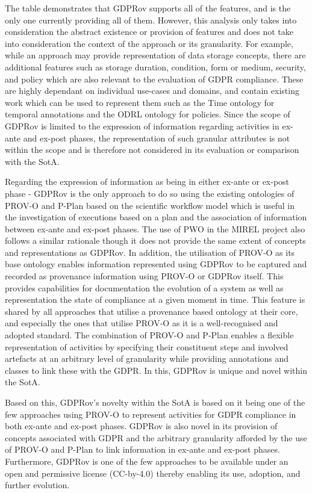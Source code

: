 The table demonstrates that GDPRov supports all of the features, and is the only one currently providing all of them. However, this analysis only takes into consideration the abstract existence or provision of features and does not take into consideration the context of the approach or its granularity. For example, while an approach may provide representation of data storage concepts, there are additional features such as storage duration, condition, form or medium, security, and policy which are also relevant to the evaluation of GDPR compliance.
These are highly dependant on individual use-cases and domains, and contain existing work which can be used to represent them such as the Time ontology \cite{cox_time_2017} for temporal annotations and the ODRL ontology \cite{iannella_odrl_2018} for policies.
Since the scope of GDPRov is limited to the expression of information regarding activities in ex-ante and ex-post phases, the representation of such granular attributes is not within the scope and is therefore not considered in its evaluation or comparison with the SotA.

Regarding the expression of information as being in either ex-ante or ex-post phase - GDPRov is the only approach to do so using the existing ontologies of PROV-O and P-Plan based on the scientific workflow model which is useful in the investigation of executions based on a plan and the association of information between ex-ante and ex-post phases. The use of PWO \cite{gangemi_publishing_2017} in the MIREL project also follows a similar rationale though it does not provide the same extent of concepts and representations as GDPRov.
In addition, the utilisation of PROV-O as its base ontology enables information represented using GDPRov to be captured and recorded as provenance information using PROV-O or GDPRov itself. This provides capabilities for documentation the evolution of a system as well as representation the state of compliance at a given moment in time.
This feature is shared by all approaches that utilise a provenance based ontology at their core, and especially the ones that utilise PROV-O as it is a well-recognised and adopted standard.
The combination of PROV-O and P-Plan enables a flexible representation of activities by specifying their constituent steps and involved artefacts at an arbitrary level of granularity while providing annotations and classes to link these with the GDPR. In this, GDPRov is unique and novel within the SotA.

Based on this, GDPRov's novelty within the SotA is based on it being one of the few approaches using PROV-O to represent activities for GDPR compliance in both ex-ante and ex-post phases. GDPRov is also novel in its provision of concepts associated with GDPR and the arbitrary granularity afforded by the use of PROV-O and P-Plan to link information in ex-ante and ex-post phases.
Furthermore, GDPRov is one of the few approaches to be available under an open and permissive license (CC-by-4.0) thereby enabling its use, adoption, and further evolution.

